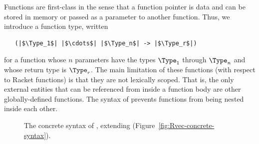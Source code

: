 \documentclass[11pt]{book}
\newcommand{\gray}[1]{{\color{gray} #1}}
\begin{document}
Functions are first-class in the sense that a function pointer
 is data and can be stored in memory or passed
as a parameter to another function.  Thus, we introduce a function
type, written
\begin{lstlisting}
   (|$\Type_1$| |$\cdots$| |$\Type_n$| -> |$\Type_r$|)
\end{lstlisting}
for a function whose $n$ parameters have the types $\Type_1$ through
$\Type_n$ and whose return type is $\Type_r$. The main limitation of
these functions (with respect to Racket functions) is that they are
not lexically scoped. That is, the only external entities that can be
referenced from inside a function body are other globally-defined
functions. The syntax of \LangFun{} prevents functions from being nested
inside each other.

\begin{figure}[tp]
\centering
\fbox{
  \begin{minipage}{0.96\textwidth}
    \small
\[
\begin{array}{lcl}
  \Type &::=& \gray{ \key{Integer} \mid \key{Boolean}
         \mid (\key{Vector}\;\Type\ldots) \mid \key{Void}  } \mid (\Type \ldots \; \key{->}\; \Type) \\
\itm{cmp} &::= & \gray{  \key{eq?} \mid \key{<} \mid \key{<=} \mid \key{>} \mid \key{>=}  } \\
  \Exp &::=& \gray{ \Int \mid \CREAD{} \mid \CNEG{\Exp} \mid \CADD{\Exp}{\Exp} \mid \CSUB{\Exp}{\Exp} } \\
    &\mid&  \gray{ \Var \mid \CLET{\Var}{\Exp}{\Exp} }\\
    &\mid& \gray{ \key{\#t} \mid \key{\#f} 
    \mid (\key{and}\;\Exp\;\Exp)
    \mid (\key{or}\;\Exp\;\Exp)
    \mid (\key{not}\;\Exp)} \\
   &\mid& \gray{(\itm{cmp}\;\Exp\;\Exp) \mid \CIF{\Exp}{\Exp}{\Exp} } \\
  &\mid& \gray{(\key{vector}\;\Exp\ldots) \mid
    (\key{vector-ref}\;\Exp\;\Int)} \\
  &\mid& \gray{(\key{vector-set!}\;\Exp\;\Int\;\Exp)\mid (\key{void})
      \mid \LP\key{has-type}~\Exp~\Type\RP } \\
  &\mid& \LP\Exp \; \Exp \ldots\RP \\
  \Def &::=& \CDEF{\Var}{\LS\Var \key{:} \Type\RS \ldots}{\Type}{\Exp} \\
  \LangFun{} &::=& \Def \ldots \; \Exp
\end{array}
\]
\end{minipage}
}
\caption{The concrete syntax of \LangFun{}, extending \LangVec{} (Figure~\ref{fig:Rvec-concrete-syntax}).}
\label{fig:Rfun-concrete-syntax}
\end{figure}
\end{document}
